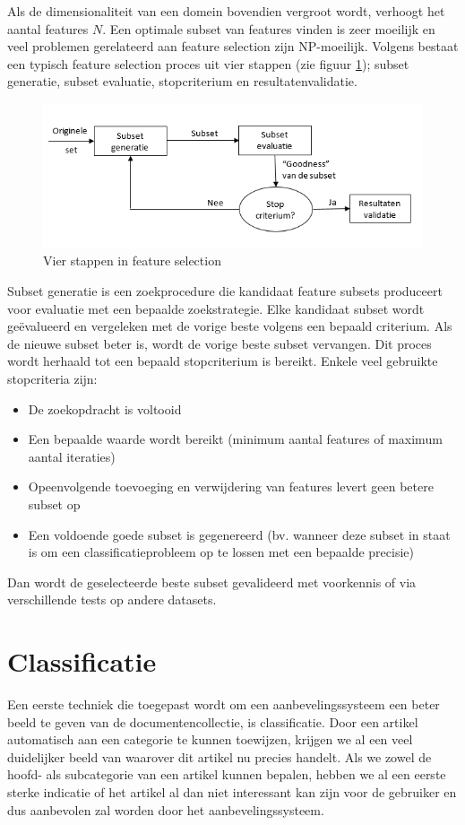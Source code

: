 Als de dimensionaliteit van een domein bovendien vergroot wordt, verhoogt het aantal features $N$. Een optimale subset van features vinden is zeer moeilijk en veel problemen gerelateerd aan feature selection zijn NP-moeilijk. Volgens \cite{Liu2005} bestaat een typisch feature selection proces uit vier stappen (zie figuur \ref{fig:feature-selection}); subset generatie, subset evaluatie, stopcriterium en resultatenvalidatie.

\begin{figure}[h]
	\caption{Vier stappen in feature selection}
	\label{fig:feature-selection}
	\includegraphics[width=\textwidth]{fig/feature-selection}
\end{figure}

Subset generatie is een zoekprocedure die kandidaat feature subsets produceert voor evaluatie met een bepaalde zoekstrategie. Elke kandidaat subset wordt ge\"evalueerd en vergeleken met de vorige beste volgens een bepaald criterium. Als de nieuwe subset beter is, wordt de vorige beste subset vervangen. Dit proces wordt herhaald tot een bepaald stopcriterium is bereikt. Enkele veel gebruikte stopcriteria zijn: 
\begin{itemize}
\item De zoekopdracht is voltooid
\item Een bepaalde waarde wordt bereikt (minimum aantal features of maximum aantal iteraties)
\item Opeenvolgende toevoeging en verwijdering van features levert geen betere subset op
\item Een voldoende goede subset is gegenereerd (bv. wanneer deze subset in staat is om een classificatieprobleem op te lossen met een bepaalde precisie)
\end{itemize}Dan wordt de geselecteerde beste subset gevalideerd met voorkennis of via verschillende tests op andere datasets. 

\section{Classificatie}
Een eerste techniek die toegepast wordt om een aanbevelingssysteem een beter beeld te geven van de documentencollectie, is classificatie. Door een artikel automatisch aan een categorie te kunnen toewijzen, krijgen we al een veel duidelijker beeld van waarover dit artikel nu precies handelt. Als we zowel de hoofd- als subcategorie van een artikel kunnen bepalen, hebben we al een eerste sterke indicatie of het artikel al dan niet interessant kan zijn voor de gebruiker en dus aanbevolen zal worden door het aanbevelingssysteem. 

